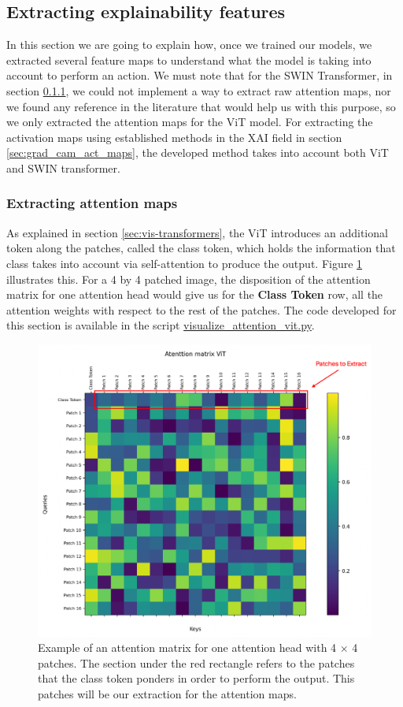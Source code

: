 \subsection{Extracting explainability features}
\label{sec:extracting_exp_feat}
In this section we are going to explain how, once we trained our models, we extracted several feature maps to understand what the model is taking into account to perform an action. We must note that for the SWIN Transformer, in section \ref{sec:extracting_attn_maps}, we could not implement a way to extract raw attention maps, nor we found any reference in the literature that would help us with this purpose, so we only extracted the attention maps for the ViT model. For extracting the activation maps using established methods in the XAI field in section \ref{sec:grad_cam_act_maps}, the developed method takes into account both ViT and SWIN transformer.

\subsubsection{Extracting attention maps}
\label{sec:extracting_attn_maps}
As explained in section \ref{sec:vis-transformers}, the ViT introduces an additional token along the patches, called the class token, which holds the information that class takes into account via self-attention to produce the output. Figure \ref{fig:classtokenattention} illustrates this. For a 4 by 4 patched image, the disposition of the attention matrix for one attention head would give us for the \textbf{Class Token} row, all the attention weights with respect to the rest of the patches. The code developed for this section is available in the script \href{https://github.com/Javimh18/DL_TFM/blob/main/src/visualize_attention_vit.py}{visualize\_attention\_vit.py}.

\begin{figure}[!h]
	\centering
	\includegraphics[width=0.7\linewidth]{figures/class_token_attention}
	\caption{Example of an attention matrix for one attention head with 4 $\times$ 4 patches. The section under the red rectangle refers to the patches that the class token ponders in order to perform the output. This patches will be our extraction for the attention maps.}
	\label{fig:classtokenattention}
\end{figure}

